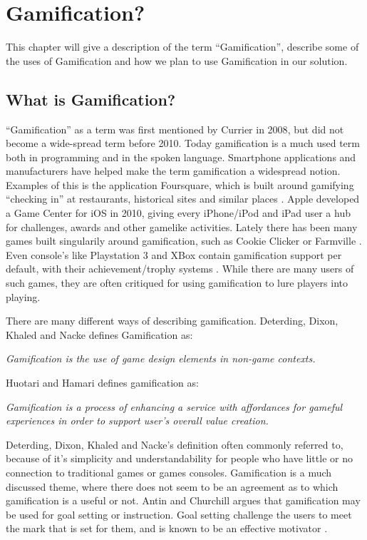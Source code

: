 \chapter{Gamification?}
\label{chp:gamification}

This chapter will give a description of the term ``Gamification'', describe some of the uses of Gamification and how we plan to use Gamification in our solution.

\section{What is Gamification?}
\label{sec:whatisgamification}
``Gamification'' as a term was first mentioned by Currier in 2008\cite{gamificationcurrier}, but did not become a wide-spread term before 2010. Today gamification is a much used term both in programming and in the spoken language. Smartphone applications and manufacturers have helped make the term gamification a widespread notion. Examples of this is the application Foursquare, which is built around gamifying ``checking in'' at restaurants, historical sites and similar places \cite{foursquare}. Apple developed a Game Center for iOS in 2010, giving every iPhone/iPod and iPad user a hub for challenges, awards and other gamelike activities\cite{applegamecenter}. Lately there has been many games built singularily around gamification, such as Cookie Clicker \cite{cookieclicker} or Farmville \cite{farmville}. Even console's like Playstation 3 and XBox contain gamification support per default, with their achievement/trophy systems \cite{xbox, playstation}. While there are many users of such games, they are often critiqued for using gamification to lure players into playing. 


There are many different ways of describing gamification. Deterding, Dixon, Khaled and Nacke\cite{Deterding:2011:GDE:2181037.2181040} defines Gamification as:

\textit{Gamification is the use of game design elements in non-game
contexts.}

Huotari and Hamari\cite{huotari2012defining} defines gamification as:

\textit{Gamification is a process of enhancing a service with affordances for gameful experiences in order to support user's overall value creation.}

Deterding, Dixon, Khaled and Nacke's definition often commonly referred to, because of it's simplicity and understandability for people who have little or no connection to traditional games or games consoles.
Gamification is a much discussed theme, where there does not seem to be an agreement as to which gamification is a useful or not. 
Antin and Churchill\cite{antin2011badges} argues that gamification may be used for goal setting or instruction. Goal setting challenge the users to meet the mark that is set for them, and is known to be an effective motivator \cite{ling2005using}. 

